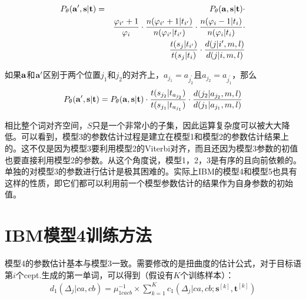 \begin{appendices}
\begin{eqnarray}
{P}_{\theta}(\mathbf{a}',\mathbf{s}|\mathbf{t}) & = & {P}_{\theta}(\mathbf{a},\mathbf{s}|\mathbf{t}) \cdot  \nonumber \\
                                                                                   &     & \frac{\varphi_{i'}+1}{\varphi_i} \cdot \frac{n(\varphi_{i'}+1|t_{i'})}{n(\varphi_{i'}|t_{i'})} \cdot \frac{n(\varphi_{i}-1|t_{i})}{n(\varphi_{i}|t_{i})} \cdot \nonumber \\
                                                                                   &     & \frac{t(s_j|t_{i'})}{t(s_{j}|t_{i})} \cdot \frac{d(j|i',m,l)}{d(j|i,m,l)}
\label{eq:1.13}
\end{eqnarray}

\parinterval 如果$\bf{a}$和$\bf{a}'$区别于两个位置$j_1$和$j_2$的对齐上，$a_{j_{1}}=a_{j_{2}^{'}}$且$a_{j_{2}}=a_{j_{1}^{'}}$，那么
\begin{eqnarray}
{P}_{\theta}(\mathbf{a'},\mathbf{s}|\mathbf{t}) = {P}_{\theta}(\mathbf{a},\mathbf{s}|\mathbf{t}) \cdot \frac{t(s_{j_{2}}|t_{a_{j_{2}}})}{t(s_{j_{1}}|t_{a_{j_{1}}})} \cdot \frac{d(j_{2}|a_{j_{2}},m,l)}{d(j_{1}|a_{j_{1}},m,l)}
\label{eq:1.14}
\end{eqnarray}

\parinterval 相比整个词对齐空间，$S$只是一个非常小的子集，因此运算复杂度可以被大大降低。可以看到，模型3的参数估计过程是建立在模型1和模型2的参数估计结果上的。这不仅是因为模型3要利用模型2的Viterbi对齐，而且还因为模型3参数的初值也要直接利用模型2的参数。从这个角度说，模型1，2，3是有序的且向前依赖的。单独的对模型3的参数进行估计是极其困难的。实际上IBM的模型4和模型5也具有这样的性质，即它们都可以利用前一个模型参数估计的结果作为自身参数的初始值。


\section{IBM模型4训练方法}

\parinterval 模型4的参数估计基本与模型3一致。需要修改的是扭曲度的估计公式，对于目标语第$i$个cept.生成的第一单词，可以得到（假设有$K$个训练样本）：
\begin{eqnarray}
d_1(\Delta_j|ca,cb) = \mu_{1cacb}^{-1} \times \sum_{k=1}^{K}c_1(\Delta_j|ca,cb;\mathbf{s}^{[k]},\mathbf{t}^{[k]})
\label{eq:1.15}
\end{eqnarray}


\end{appendices}
